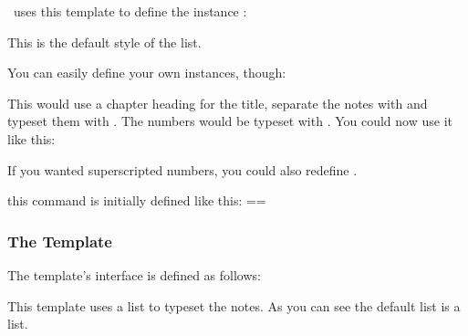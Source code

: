 \documentclass[load-preamble+]{cnltx-doc}
\begin{document}
\enotez\ uses this template to define the instance :
\begin{sourcecode}
\end{sourcecode}
This is the default style of the list.

You can easily define your own instances, though:
This would use a chapter heading for the title, separate the notes with
 and typeset them with .  The numbers would
be typeset with .  You could now use it like this:
\begin{sourcecode}
  \printendnotes[custom]
\end{sourcecode}

If you wanted superscripted numbers, you could also redefine . 
\begin{commands}
    this command is initially defined like this:
    \verbcode=\newcommand*\enmark[1]{#1.}=
\end{commands}

\subsubsection{The  Template}
The  template's interface is defined as follows:
This template uses a list to typeset the notes.  As you can see the default
list is a  list.
\end{document}
